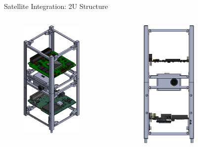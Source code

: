 
\begin{frame}{Satellite Integration: 2U Structure}

    \begin{columns}[t]
        \begin{column}[t]{0.3\textwidth}
            \begin{figure}[!ht]
                \begin{center}
                    \includegraphics[width=3cm]{figures/slcam-ex1.png}
                \end{center}
            \end{figure}
        \end{column}
        \begin{column}[t]{0.3\textwidth}
            \begin{figure}[!ht]
                \begin{center}
                    \includegraphics[width=2.7cm]{figures/slcam-ex2.png}
                \end{center}
            \end{figure}
        \end{column}
        \begin{column}[t]{0.3\textwidth}

\end{column}
\end{columns}
\end{frame}
